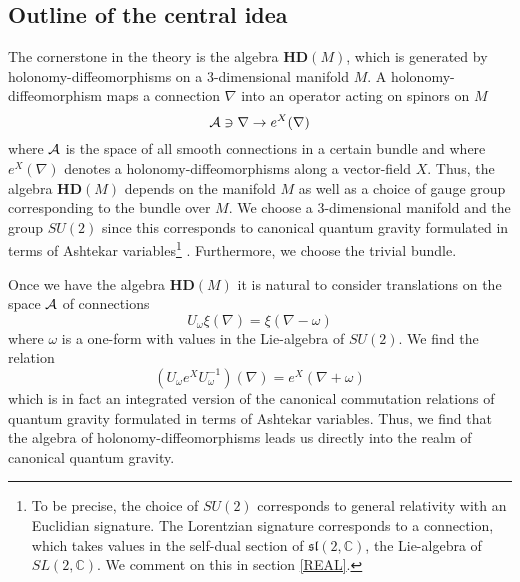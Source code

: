 \documentclass[12pt]{article}
\def\oo{\omega}
\def\ca{{\cal A}}
\begin{document}






\subsection{Outline of the central idea}



The cornerstone in the theory is the algebra $\mathbf{HD}(M)$, which is generated by holonomy-diffeomorphisms on a 3-dimensional manifold $M$. A holonomy-diffeomorphism maps a connection $\nabla$ into an operator acting on spinors on $M$
$$
\ca \ni \nabla \rightarrow e^X(\nabla)
$$
where $\ca$ is the space of all smooth connections in a certain bundle and where $e^X(\nabla)$ denotes a holonomy-diffeomorphisms along a vector-field $X$. Thus, the algebra $\mathbf{HD}(M)$ depends on the manifold $M$ as well as a choice of gauge group corresponding to the bundle over $M$. We choose a 3-dimensional manifold and the group $SU(2)$ since this corresponds to canonical quantum gravity formulated in terms of Ashtekar variables\footnote{To be precise, the choice of $SU(2)$ corresponds to general relativity with an Euclidian signature. The Lorentzian signature corresponds to a connection, which takes values in the self-dual section of $\mathfrak{sl}(2,\mathbb{C})$, the Lie-algebra of $SL(2,\mathbb{C})$. We comment on this in section \ref{REAL}. } \cite{Ashtekar:1986yd,Ashtekar:1987gu}. Furthermore, we choose the trivial bundle.

Once we have the algebra $\mathbf{HD}(M)$ it is natural to consider translations on the space $\ca$ of connections
$$
U_{\oo} \xi(\nabla) = \xi(\nabla - \oo)
$$
where $\oo$ is a one-form with values in the Lie-algebra of $SU(2)$. We find the relation
$$
(U_\oo e^X U_\oo^{-1})(\nabla) = e^X (\nabla + \oo)
$$
which is in fact an integrated version of the canonical commutation relations of quantum gravity formulated in terms of Ashtekar variables. Thus, we find that the algebra of holonomy-diffeomorphisms leads us directly into the realm of canonical quantum gravity.\\

\end{document}

